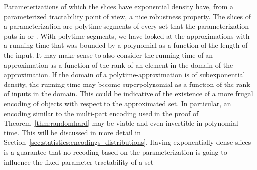 Parameterizations of which the slices have exponential density have, from a parameterized tractability point of view, a nice robustness property.
The slices of a parameterization are polytime-segments of every set that the parameterization puts in  or .
With polytime-segments, we have looked at the approximations with a running time that was bounded by a polynomial as a function of the length of the input.
It may make sense to also consider the running time of an approximation as a function of the rank of an element in the domain of the approximation.
If the domain of a polytime-approximation is of subexponential density, the running time may become superpolynomial as a function of the rank of inputs in the domain.
This could be indicative of the existence of a more frugal encoding of objects with respect to the approximated set.
In particular, an encoding similar to the multi-part encoding used in the proof of Theorem~\ref{thm:randomhard} may be viable and even invertible in polynomial time.
This will be discussed in more detail in Section~\ref{sec:statistics:encodings_distributions}.
Having exponentially dense slices is a guarantee that no recoding based on the parameterization is going to influence the fixed-parameter tractability of a set.

